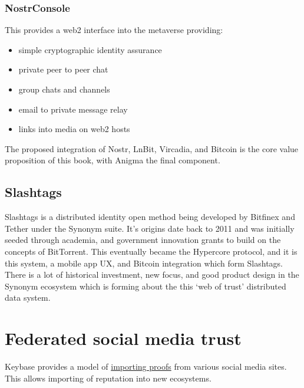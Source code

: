 \subsubsection{NostrConsole}
This provides a web2 interface into the metaverse providing:
\begin{itemize}
\item simple cryptographic identity assurance
\item private peer to peer chat
\item group chats and channels
\item email to private message relay
\item links into media on web2 hosts
\end{itemize}
The proposed integration of Nostr, LnBit, Vircadia, and Bitcoin is the core value proposition of this book, with Anigma the final component.
\subsection{Slashtags}
Slashtags is a distributed identity open method being developed by Bitfinex and Tether under the Synonym suite. It's origins date back to 2011 and was initially seeded through academia, and government innovation grants to build on the concepts of BitTorrent. This eventually became the Hypercore protocol, and it is this system, a mobile app UX, and Bitcoin integration which form Slashtags. There is a lot of historical investment, new focus, and good product design in the Synonym ecosystem which is forming about the this `web of trust' distributed data system.
\section{Federated social media trust}
Keybase provides a model of \href{https://book.keybase.io/account#proofs}{importing proofs} from various social media sites. This allows importing of reputation into new ecosystems.
